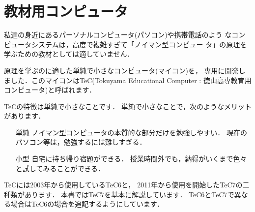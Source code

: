 \section{教材用コンピュータ}

私達の身近にあるパーソナルコンピュータ(パソコン)や携帯電話のよう
なコンピュータシステムは，高度で複雑すぎて「ノイマン型コンピュー
タ」の原理を学ぶための教材としては適していません．

原理を学ぶのに適した単純で小さなコンピュータ(マイコン)を，
専用に開発しました．このマイコンはTeC(Tokuyama Educational
Computer : 徳山高専教育用コンピュータ)と呼ばれます．

TeCの特徴は単純で小さなことです．
単純で小さなことで，次のようなメリットがあります．

\begin{itemize}
\item[単純]
ノイマン型コンピュータの本質的な部分だけを勉強しやすい．
現在のパソコン等は，勉強するには難しすぎる．
\item[小型]
自宅に持ち帰り宿題ができる．
授業時間外でも，納得がいくまで色々と試してみることができる．
\end{itemize}

TeCには2003年から使用しているTeC6と，
2011年から使用を開始したTeC7の二種類があります．
本書ではTeC7を基本に解説しています．
TeC6とTeC7で異なる場合はTeC6の場合を追記するようにしています．


